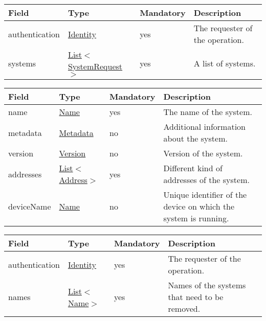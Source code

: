 \documentclass[a4paper]{arrowhead}
\newcommand{\pref}[1]{{\textcolor{ArrowheadGrey}{\hyperref[sec:model:primitives:#1]{#1}}}}
\begin{document}
\label{sec:model:SystemListRequest}
 
\begin{table}[ht!]
\begin{tabularx}{\textwidth}{| p{2.5cm} | p{3.5cm} | p{2cm} | X |} \hline
\rowcolor{gray!33} Field & Type & Mandatory & Description \\ \hline
authentication & \hyperref[sec:model:Identity]{Identity} & yes & The requester of the operation. \\ \hline
systems & \pref{List}$<$\hyperref[sec:model:SystemRequest]{SystemRequest}$>$ & yes & A list of systems. \\ \hline
\end{tabularx}
\end{table}

\label{sec:model:SystemRequest}
 
\begin{table}[ht!]
\begin{tabularx}{\textwidth}{| p{2.5cm} | p{2.5cm} | p{2cm} | X |} \hline
\rowcolor{gray!33} Field & Type & Mandatory & Description \\ \hline
name & \pref{Name} & yes & The name of the system. \\ \hline
metadata &\hyperref[sec:model:Metadata]{Metadata} & no & Additional information about the system. \\ \hline
version &\pref{Version} & no & Version of the system. \\ \hline
addresses &  \pref{List}$<$\pref{Address}$>$ & yes & Different kind of addresses of the system.  \\ \hline
deviceName & \pref{Name} & no & Unique identifier of the device on which the system is running. \\ \hline
\end{tabularx}
\end{table}

\label{sec:model:SystemRemoveRequest}

\begin{table}[H]
\begin{tabularx}{\textwidth}{| p{2.5cm} | p{2.5cm} | p{2cm} | X |} \hline
\rowcolor{gray!33} Field & Type & Mandatory & Description \\ \hline
authentication & \hyperref[sec:model:Identity]{Identity} & yes & The requester of the operation. \\ \hline
names &  \pref{List}$<$\pref{Name}$>$ & yes & Names of the systems that need to be removed. \\ \hline
\end{tabularx}
\end{table}
\end{document}
